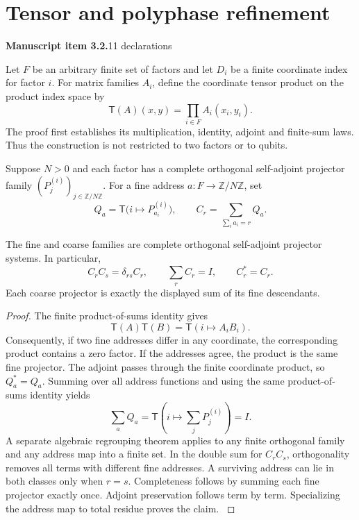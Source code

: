 \section{Tensor and polyphase refinement}\label{supp2:section:002}
\textbf{Manuscript item 3.2.}\quad {}\hfill 11 declarations

Let $F$ be an arbitrary finite set of factors and let $D_i$ be a finite coordinate index for factor $i$. For matrix families $A_i$, define the coordinate tensor product on the product index space by
\[
 \mathsf T(A)(x,y)=\prod_{i\in F} A_i(x_i,y_i).
\]
The proof first establishes its multiplication, identity, adjoint and finite-sum laws. Thus the construction is not restricted to two factors or to qubits.

Suppose $N>0$ and each factor has a complete orthogonal self-adjoint projector family $(P^{(i)}_j)_{j\in\mathbb Z/N\mathbb Z}$. For a fine address $a:F\to\mathbb Z/N\mathbb Z$, set
\[
 Q_a=\mathsf T\bigl(i\mapsto P^{(i)}_{a_i}\bigr),
 \qquad
 C_r=\sum_{\sum_i a_i=r}Q_a.
\]

\begin{statement}\label{supp2:statement:002}
The fine and coarse families are complete orthogonal self-adjoint projector systems. In particular,
\[
 C_rC_s=\delta_{rs}C_r,\qquad
 \sum_r C_r=I,\qquad C_r^*=C_r.
\]
Each coarse projector is exactly the displayed sum of its fine descendants.
\end{statement}

\begin{proof}\label{supp2:proof:002}
The finite product-of-sums identity gives
\[
 \mathsf T(A)\mathsf T(B)=\mathsf T(i\mapsto A_iB_i).
\]
Consequently, if two fine addresses differ in any coordinate, the corresponding product contains a zero factor. If the addresses agree, the product is the same fine projector. The adjoint passes through the finite coordinate product, so $Q_a^*=Q_a$. Summing over all address functions and using the same product-of-sums identity yields
\[
 \sum_a Q_a=\mathsf T\left(i\mapsto\sum_jP^{(i)}_j\right)=I.
\]
A separate algebraic regrouping theorem applies to any finite orthogonal family and any address map into a finite set. In the double sum for $C_rC_s$, orthogonality removes all terms with different fine addresses. A surviving address can lie in both classes only when $r=s$. Completeness follows by summing each fine projector exactly once. Adjoint preservation follows term by term. Specializing the address map to total residue proves the claim.
\label{supp2:proof:002:end}\end{proof}

